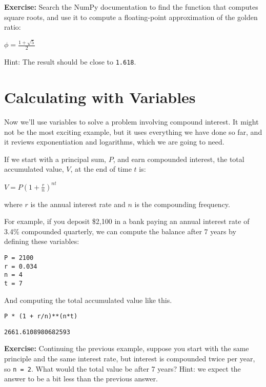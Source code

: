 \textbf{Exercise:} Search the NumPy documentation to find the function
that computes square roots, and use it to compute a floating-point
approximation of the golden ratio:

\(\phi = \frac{1 + \sqrt{5}}{2}\)

Hint: The result should be close to \passthrough{\lstinline!1.618!}.

\hypertarget{calculating-with-variables}{%
\section{Calculating with Variables}\label{calculating-with-variables}}

Now we'll use variables to solve a problem involving compound interest.
It might not be the most exciting example, but it uses everything we
have done so far, and it reviews exponentiation and logarithms, which we
are going to need.

If we start with a principal sum, \(P\), and earn compounded interest,
the total accumulated value, \(V\), at the end of time \(t\) is:

\(V=P\left(1+{\frac {r}{n}}\right)^{nt}\)

where \(r\) is the annual interest rate and \(n\) is the compounding
frequency.

For example, if you deposit \$2,100 in a bank paying an annual interest
rate of 3.4\% compounded quarterly, we can compute the balance after 7
years by defining these variables:

\begin{lstlisting}[]
P = 2100
r = 0.034
n = 4
t = 7
\end{lstlisting}

And computing the total accumulated value like this.

\begin{lstlisting}[]
P * (1 + r/n)**(n*t)
\end{lstlisting}

\begin{lstlisting}[style=output]
2661.6108980682593
\end{lstlisting}

\textbf{Exercise:} Continuing the previous example, suppose you start
with the same principle and the same interest rate, but interest is
compounded twice per year, so \passthrough{\lstinline!n = 2!}. What
would the total value be after 7 years? Hint: we expect the answer to be
a bit less than the previous answer.

